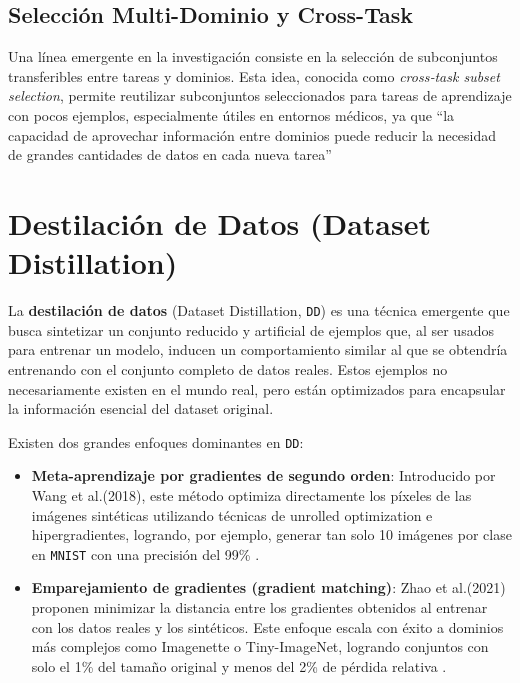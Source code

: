 \subsection{Selección Multi-Dominio y Cross-Task}

Una línea emergente en la investigación consiste en la selección de subconjuntos transferibles entre tareas y dominios.
Esta idea, conocida como \textit{cross‑task subset selection}, permite reutilizar subconjuntos seleccionados para tareas de aprendizaje con pocos ejemplos,
especialmente útiles en entornos médicos, ya que “la capacidad de aprovechar información entre dominios puede reducir la necesidad de grandes cantidades de datos en cada nueva tarea”~\cite{woernerComprehensiveEasytouseMultidomain2025}


\section{Destilación de Datos (Dataset Distillation)}
La \textbf{destilación de datos} (Dataset Distillation, \texttt{DD}) es una técnica emergente que busca sintetizar un conjunto reducido y artificial de ejemplos que, al ser usados para entrenar un modelo, inducen un comportamiento similar al que se obtendría entrenando con el conjunto completo de datos reales.
Estos ejemplos no necesariamente existen en el mundo real, pero están optimizados para encapsular la información esencial del dataset original.

Existen dos grandes enfoques dominantes en \texttt{DD}:

\begin{itemize}
      \item \textbf{Meta-aprendizaje por gradientes de segundo orden}: Introducido por Wang et al.(2018), este método optimiza directamente los píxeles de las imágenes sintéticas utilizando técnicas de unrolled optimization e hipergradientes, logrando, por ejemplo, generar tan solo 10 imágenes por clase en \texttt{MNIST} con una precisión del 99\% \cite{wangDatasetDistillation2020}.
      \item \textbf{Emparejamiento de gradientes (gradient matching)}: Zhao et al.(2021) proponen minimizar la distancia entre los gradientes obtenidos al entrenar con los datos reales y los sintéticos.
            Este enfoque escala con éxito a dominios más complejos como Imagenette o Tiny-ImageNet, logrando conjuntos con solo el 1\% del tamaño original y menos del 2\% de pérdida relativa \cite{zhaoDatasetCondensationGradient2021}.
\end{itemize}


